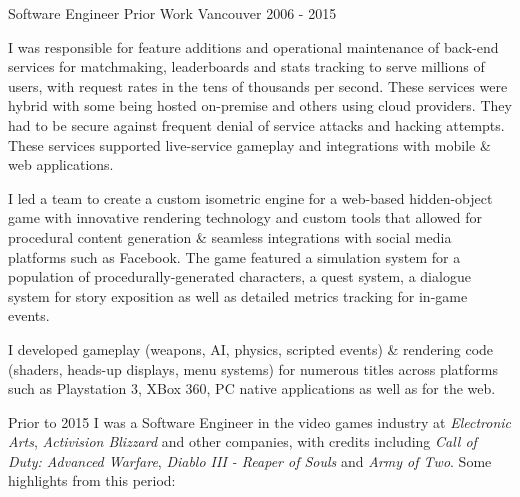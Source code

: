 \begin{cventries}
\cventrywithsummary
{Software Engineer} %
{Prior Work} %
{Vancouver} %
{2006 - 2015} %
{
  \begin{cvitems} %
    \item {I was responsible for feature additions and operational maintenance of back-end services for matchmaking, leaderboards and stats tracking to serve millions of users, with request rates in the tens of thousands per second. These services were hybrid with some being hosted on-premise and others using cloud providers. They had to be secure against frequent denial of service attacks and hacking attempts. These services supported live-service gameplay and integrations with mobile \& web applications.}
    \item {I led a team to create a custom isometric engine for a web-based hidden-object game with innovative rendering technology and custom tools that allowed for procedural content generation \& seamless integrations with social media platforms such as Facebook. The game featured a simulation system for a population of procedurally-generated characters, a quest system, a dialogue system for story exposition as well as detailed metrics tracking for in-game events.}
    \item {I developed gameplay (weapons, AI, physics, scripted events) \& rendering code (shaders, heads-up displays, menu systems) for numerous titles across platforms such as Playstation 3, XBox 360, PC native applications as well as for the web.}
  \end{cvitems}
}
{
  Prior to 2015 I was a Software Engineer in the video games industry at \textit{Electronic Arts}, \textit{Activision Blizzard} and other companies,
  with credits including \textit{Call of Duty: Advanced Warfare}, \textit{Diablo III - Reaper of Souls} and \textit{Army of Two}. Some highlights from this period:
}

\end{cventries}